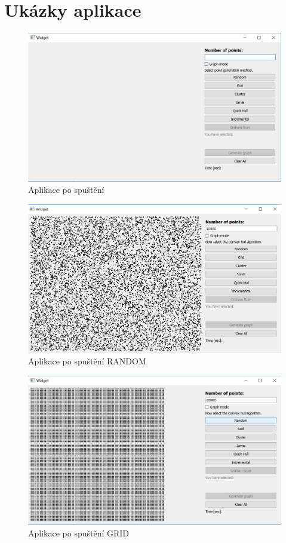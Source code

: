 \documentclass{article}
\begin{document}
\section{Ukázky aplikace} %
\bigskip
\begin{figure}[htbp]
\centering
        \includegraphics[clip, trim=0cm 0cm 0cm 0cm, width=1\textwidth]{obrazek1.png}
        \caption{Aplikace po spuštění}
\end{figure}
\begin{figure}[htbp]
\centering
        \includegraphics[clip, trim=0cm 0cm 0cm 0cm, width=1\textwidth]{obrazek2.png}
        \caption{Aplikace po spuštění RANDOM}
\end{figure}
\begin{figure}[htbp]
\centering
        \includegraphics[clip, trim=0cm 0cm 0cm 0cm, width=1\textwidth]{obrazek3.png}
        \caption{Aplikace po spuštění GRID}
\end{figure}
\end{document}
